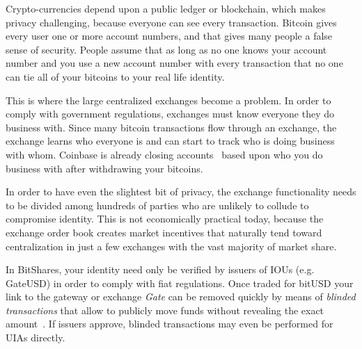 Crypto-currencies depend upon a public ledger or blockchain, which makes
privacy challenging, because everyone can see every transaction. Bitcoin gives
every user one or more account numbers, and that gives many people a false
sense of security. People assume that as long as no one knows your account
number and you use a new account number with every transaction that no one can
tie all of your bitcoins to your real life identity.

This is where the large centralized exchanges become a problem. In order to
comply with government regulations, exchanges must know everyone they do
business with. Since many bitcoin transactions flow through an exchange, the
exchange learns who everyone is and can start to track who is doing business
with whom. Coinbase is already closing accounts~\cite{coinbase:privacy} based
upon who you do business with after withdrawing your bitcoins.

In order to have even the slightest bit of privacy, the exchange functionality
needs to be divided among hundreds of parties who are unlikely to collude to
compromise identity. This is not economically practical today, because the
exchange order book creates market incentives that naturally tend toward
centralization in just a few exchanges with the vast majority of market share.

In BitShares, your identity need only be verified by issuers of IOUs (e.g.
GateUSD) in order to comply with fiat regulations. Once traded for bitUSD your
link to the gateway or exchange \emph{Gate} can be removed quickly by means of
\emph{blinded transactions} that allow to publicly move funds without revealing
the exact amount~\cite{bts:general,blindSigPaper}. If issuers approve, blinded
transactions may even be performed for UIAs directly.
